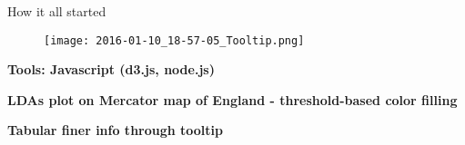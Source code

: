 \documentclass[xcolor=x11names,compress]{beamer}
\renewcommand{\(}{\begin{columns}}
\renewcommand{\)}{\end{columns}}
\newcommand{\<}[1]{\begin{column}{#1}}
\renewcommand{\>}{\end{column}}
\begin{document}




\begin{frame}{How it all started}
\begin{figure}\centering
	 \texttt{[image: 2016-01-10\_18-57-05\_Tooltip.png]}
\end{figure}

\end{frame}

\begin{frame}{}
\large
\pause
\begin{block}{}
\bf  Tools: Javascript (d3.js, node.js)
\end{block}
\pause
\vspace{6 mm}
\begin{block}{}
\bf LDAs plot on Mercator map of England - threshold-based color filling
\end{block}
\pause
\vspace{6 mm}
\begin{block}{}
\bf Tabular finer info through tooltip 
\end{block}
\end{frame}
\end{document}
